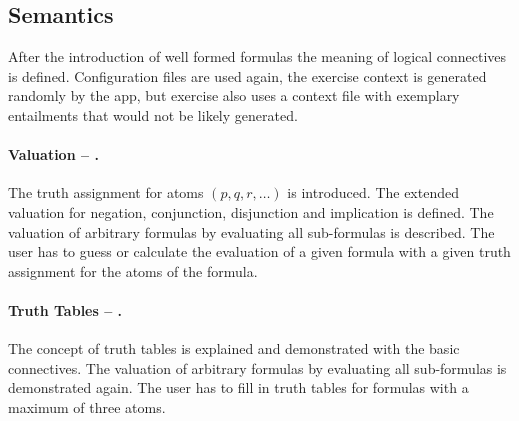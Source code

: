 
%



%


\subsection{Semantics}

After the introduction of well formed formulas the meaning of logical connectives is defined.
Configuration files are used again, the exercise context is generated randomly by the app, 
but exercise  
also uses a context file with exemplary entailments that would not be likely generated.

\paragraph{Valuation – .}
\label{tut:31}
The truth assignment for atoms $(p,q,r,…)$ is introduced. 
The extended valuation for negation, conjunction, disjunction and implication is defined.
The valuation of arbitrary formulas by evaluating all sub-formulas is described.
The user has to guess or calculate the evaluation of a given formula with a given truth assignment for the atoms of the formula.

\paragraph{Truth Tables – .}
\label{tut:32}
The concept of truth tables is explained and demonstrated with the basic connectives. 
The valuation of arbitrary formulas by evaluating all sub-formulas is demonstrated again.
The user has to fill in truth tables for formulas with a maximum of three atoms.

